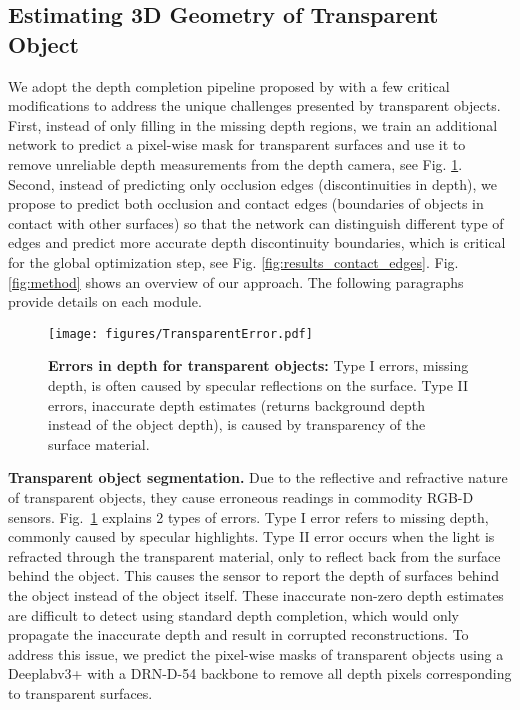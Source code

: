 \documentclass[letterpaper, 10 pt, conference]{ieeeconf}
\newcommand{\figref}[1]{Fig.~\ref{#1}}
\newcommand{\myparagraph}[1]{\vspace{0.03in}\noindent\textbf{#1}}
\begin{document}
\subsection{Estimating 3D Geometry of Transparent Object \label{sec:vision}}
We adopt the depth completion pipeline proposed by \citet{zhang2018deepdepth} with a few critical modifications to address the unique challenges presented by transparent objects. 
First, instead of only filling in the missing depth regions, we train an additional network to predict a pixel-wise mask for transparent surfaces and use it to remove unreliable depth measurements from the depth camera, see Fig. \ref{fig:sensor_errors}.
Second, instead of predicting only occlusion edges (discontinuities in depth), we propose to predict both occlusion and contact edges (boundaries of objects in contact with other surfaces) so that the network can distinguish different type of edges and predict more accurate depth discontinuity boundaries, which is critical for the global optimization step, see Fig. \ref{fig:results_contact_edges}. 
Fig. \ref{fig:method} shows an overview of our approach. The following paragraphs provide details on each module.

\begin{figure}[t]
    \centering
    \texttt{[image: figures/TransparentError.pdf]}
    \caption{\textbf{Errors in depth for transparent objects:} Type I errors, missing depth, is often caused by specular reflections on the surface. Type II errors, inaccurate depth estimates (returns background depth instead of the object depth), is caused by transparency of the surface material. 
    }
    \label{fig:sensor_errors}
    \vspace{-4mm}
\end{figure}

\myparagraph{Transparent object segmentation.}
Due to the reflective and refractive nature of transparent objects, they cause erroneous readings in commodity RGB-D sensors.
\figref{fig:sensor_errors} explains 2 types of errors. Type I error refers to missing depth, commonly caused by specular highlights. Type II error occurs when the light is refracted through the transparent material, only to reflect back from the surface behind the object. This causes the sensor to report the depth of surfaces behind the object instead of the object itself. These inaccurate non-zero depth estimates are difficult to detect using standard depth completion, which would only propagate the inaccurate depth and result in corrupted reconstructions.
To address this issue, we predict the pixel-wise masks of transparent objects using a Deeplabv3+ \cite{chen2018encoder} with a DRN-D-54 backbone \cite{Yu2017} to remove all depth pixels corresponding to transparent surfaces.
\end{document}
